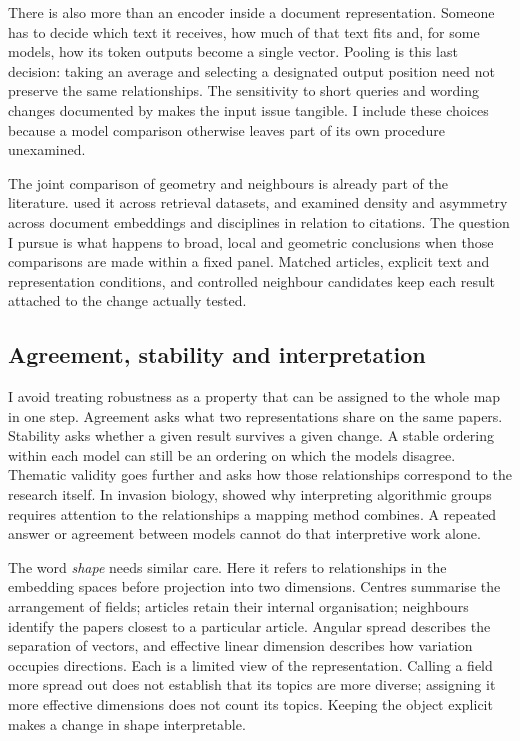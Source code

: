 \documentclass[12pt]{article}
\begin{document}
There is also more than an encoder inside a document representation. Someone has to decide which text it receives, how much of that text fits and, for some models, how its token outputs become a single vector. Pooling is this last decision: taking an average and selecting a designated output position need not preserve the same relationships. The sensitivity to short queries and wording changes documented by \citet{singh-singh-2022-inefficiency} makes the input issue tangible. I include these choices because a model comparison otherwise leaves part of its own procedure unexamined.

The joint comparison of geometry and neighbours is already part of the literature. \citet{ref4e1e0d5582} used it across retrieval datasets, and \citet{ref6da178065c} examined density and asymmetry across document embeddings and disciplines in relation to citations. The question I pursue is what happens to broad, local and geometric conclusions when those comparisons are made within a fixed panel. Matched articles, explicit text and representation conditions, and controlled neighbour candidates keep each result attached to the change actually tested.

\subsection{Agreement, stability and interpretation}
I avoid treating robustness as a property that can be assigned to the whole map in one step. Agreement asks what two representations share on the same papers. Stability asks whether a given result survives a given change. A stable ordering within each model can still be an ordering on which the models disagree. Thematic validity goes further and asks how those relationships correspond to the research itself. In invasion biology, \citet{QSSreviewQ17} showed why interpreting algorithmic groups requires attention to the relationships a mapping method combines. A repeated answer or agreement between models cannot do that interpretive work alone.

The word \emph{shape} needs similar care. Here it refers to relationships in the embedding spaces before projection into two dimensions. Centres summarise the arrangement of fields; articles retain their internal organisation; neighbours identify the papers closest to a particular article. Angular spread describes the separation of vectors, and effective linear dimension describes how variation occupies directions. Each is a limited view of the representation. Calling a field more spread out does not establish that its topics are more diverse; assigning it more effective dimensions does not count its topics. Keeping the object explicit makes a change in shape interpretable.
\end{document}

